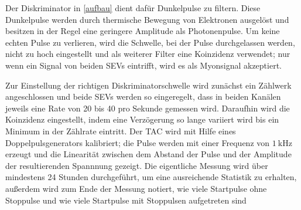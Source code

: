 Der Diskriminator in \autoref{aufbau} dient dafür Dunkelpulse zu filtern. Diese Dunkelpulse werden durch thermische Bewegung von Elektronen ausgelöst und besitzen in der Regel eine geringere Amplitude als Photonenpulse. Um keine echten Pulse zu verlieren, wird die Schwelle, bei der Pulse durchgelassen werden, nicht zu hoch eingestellt und als weiterer Filter eine Koinzidenz verwendet; nur wenn ein Signal von beiden SEVs eintrifft, wird es als Myonsignal akzeptiert.

Zur Einstellung der richtigen Diskriminatorschwelle wird zunächst ein Zählwerk angeschlossen und beide SEVs werden so eingeregelt, dass in beiden Kanälen jeweils eine Rate von 20 bis 40 pro Sekunde gemessen wird. Daraufhin wird die Koinzidenz eingestellt, indem eine Verzögerung so lange variiert wird bis ein Minimum in der Zählrate eintritt. Der TAC wird mit Hilfe eines Doppelpulsgenerators kalibriert; die Pulse werden mit einer Frequenz von $\SI{1}{\kilo\hertz}$ erzeugt und die Linearität zwischen dem Abstand der Pulse und der Amplitude der resultierenden Spannnung gezeigt. Die eigentliche Messung wird über mindestens 24 Stunden durchgeführt, um eine ausreichende Statistik zu erhalten, außerdem wird zum Ende der Messung notiert, wie viele Startpulse ohne Stoppulse und wie viele Startpulse mit Stoppulsen aufgetreten sind

